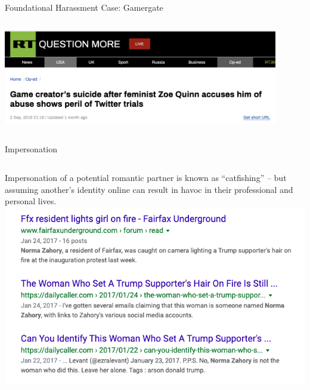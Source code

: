 \documentclass[nobackground,dvipsnames,table,aspectratio=169]{beamer}
\begin{document}
\begin{frame}{Foundational Harassment Case: Gamergate}
\begin{columns}
\begin{columns}
                    \includegraphics[width=0.9\textwidth]{rt-zoe-quinn}
            \end{columns}
    \end{columns}
\end{frame}

\begin{frame}{Impersonation}
    \begin{columns}
            \centering
            \small
            Impersonation of a potential romantic partner is known as “catfishing” -- but assuming another’s identity online can result in havoc in their professional and personal lives.
            \includegraphics[width=\textwidth]{hair-on-fire-search}

\end{columns}
\end{frame}
\end{document}
